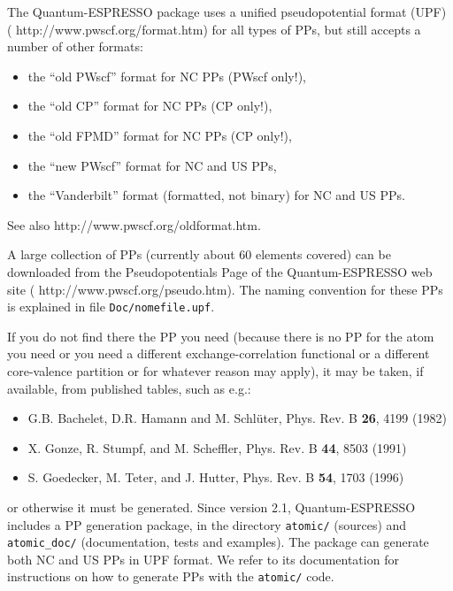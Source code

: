 \documentclass[12pt,a4paper]{article}
\begin{document}
The Quantum-ESPRESSO package uses a unified pseudopotential format (UPF)
(%
                   {http://www.pwscf.org/format.htm})
for all types of PPs, but still accepts a number of other formats:
\begin{itemize}
  \item the ``old PWscf'' format for NC PPs (PWscf only!),
  \item the ``old CP'' format for NC PPs (CP only!),
  \item the ``old FPMD'' format for NC PPs (CP only!),
  \item the ``new PWscf'' format for NC and US PPs,
  \item the ``Vanderbilt'' format (formatted, not binary) for NC and
        US PPs.
\end{itemize}
See also
%
                  {http://www.pwscf.org/oldformat.htm}.

A large collection of PPs (currently about 60 elements covered) can
be downloaded from the Pseudopotentials Page of the Quantum-ESPRESSO
web site
(%
                   {http://www.pwscf.org/pseudo.htm}).
The naming convention for these PPs is explained in file
\texttt{Doc/nomefile.upf}.

If you do not find there the PP you need (because there is no PP for
the atom you need or you need a different exchange-correlation
functional or a different core-valence partition or for whatever
reason may apply), it may be taken, if available, from published
tables, such as e.g.:
\begin{itemize}
  \item G.B. Bachelet, D.R. Hamann and M. Schl\"uter, Phys. Rev. B
        \textbf{26}, 4199 (1982)
  \item X. Gonze, R. Stumpf, and M. Scheffler, Phys. Rev. B
        \textbf{44}, 8503 (1991)
  \item S. Goedecker, M. Teter, and J. Hutter, Phys. Rev. B
        \textbf{54}, 1703 (1996)
\end{itemize}
or otherwise it must be generated. Since version 2.1, Quantum-ESPRESSO 
includes a PP generation package, in the
directory \texttt{atomic/} (sources) and \texttt{atomic\_doc/}
(documentation, tests and examples). 
The package can generate both NC and US PPs in UPF format.
We refer to its documentation for instructions on how to generate PPs
with the \texttt{atomic/} code.
\end{document}
